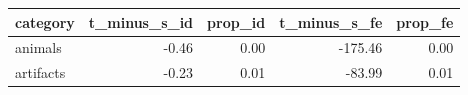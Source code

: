 \begin{table}[ht]
\centering
\begin{tabular}{lrrrr}
  \hline
category & t\_minus\_s\_id & prop\_id & t\_minus\_s\_fe & prop\_fe \\ 
  \hline
animals & -0.46 & 0.00 & -175.46 & 0.00 \\ 
  artifacts & -0.23 & 0.01 & -83.99 & 0.01 \\ 
   \hline
\end{tabular}
\end{table}
